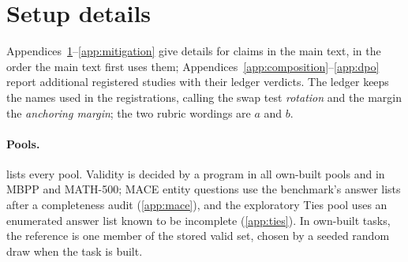 
\FloatBarrier
\section{Setup details}
\label{app:setup}

Appendices~\ref{app:setup}--\ref{app:mitigation} give details for claims in the main text, in the order the main text first uses them; Appendices~\ref{app:composition}--\ref{app:dpo} report additional registered studies with their ledger verdicts. The ledger keeps the names used in the registrations, calling the swap test \emph{rot\-ation} and the margin the \emph{an\-choring margin}; the two rubric wordings are $a$ and $b$.

\paragraph{Pools.}
 lists every pool. Validity is decided by a program in all own-built pools and in MBPP and MATH-500; \textsc{MACE} entity questions use the benchmark's answer lists after a completeness audit (\cref{app:mace}), and the exploratory Ties pool uses an enumerated answer list known to be incomplete (\cref{app:ties}).
In own-built tasks, the reference is one member of the stored valid set, chosen by a seeded random draw when the task is built.

